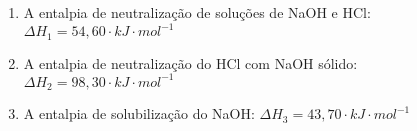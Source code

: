         \begin{enumerate}
        	\item A entalpia de neutralização de soluções de NaOH e HCl: $\Delta H_{1} = 54,60 \cdot kJ \cdot mol ^{-1}$
        	\item A entalpia de neutralização do HCl com NaOH sólido: $\Delta H_{2} = 98,30 \cdot kJ \cdot mol^{-1}$
        	\item A entalpia de solubilização do NaOH: $\Delta H_{3} = 43,70 \cdot kJ \cdot mol^{-1}$
        \end{enumerate}
            

        

